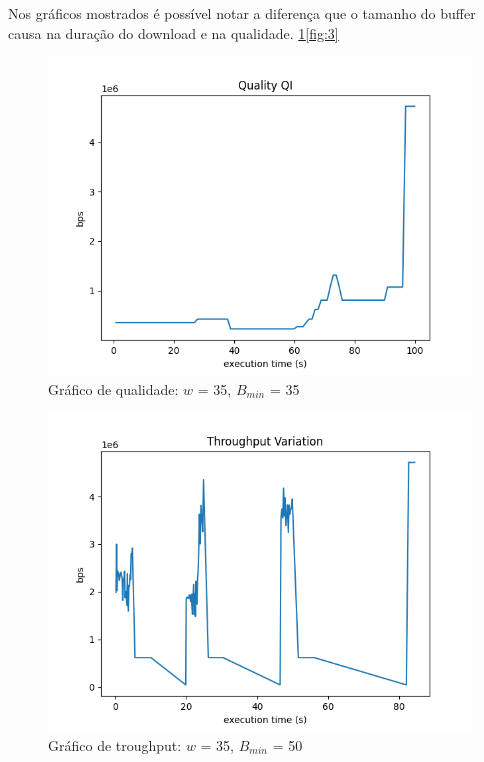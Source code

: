 \documentclass[10pt,twocolumn,letterpaper]{article}
\begin{document}
	Nos gráficos mostrados é possível notar a diferença que o tamanho do buffer causa na duração do download e na qualidade. \ref{fig:1}\ref{fig:3}
	\begin{figure}
		\centering
		\includegraphics[width=\linewidth]{0.35 - 35 - qual.png}
		\caption{Gráfico de qualidade: $w$ = 35, $B_{min}$ = 35}
		\label{fig:1}
	\end{figure}
	\begin{figure}
		\centering
		\includegraphics[width=\linewidth]{0.358 -35 -throughput.png}
		\caption{Gráfico de troughput: $w$ = 35, $B_{min}$ = 50}
		\label{fig:2}
	\end{figure}
\end{document}
